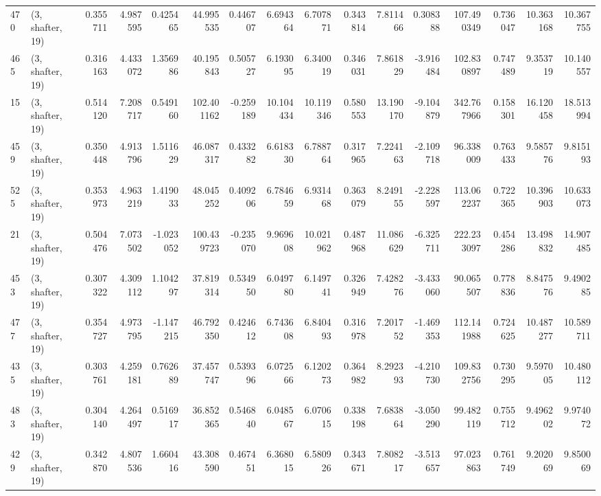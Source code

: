 \begin{tabular}{llrrrrrrrrrrrrrr}
470 &  (3, shafter, 19) &   0.355711 &   4.987595 &   0.425465 &    44.995535 &   0.446707 &   6.694364 &   6.707871 &  0.343814 &   7.811466 &   0.308388 &    107.490349 &   0.736047 &  10.363168 &   10.367755 \\
465 &  (3, shafter, 19) &   0.316163 &   4.433072 &   1.356986 &    40.195843 &   0.505727 &   6.193095 &   6.340019 &  0.346031 &   7.861829 &  -3.916484 &    102.830897 &   0.747489 &   9.353719 &   10.140557 \\
15  &  (3, shafter, 19) &   0.514120 &   7.208717 &   0.549160 &   102.401162 &  -0.259189 &  10.104434 &  10.119346 &  0.580553 &  13.190170 &  -9.104879 &    342.767966 &   0.158301 &  16.120458 &   18.513994 \\
459 &  (3, shafter, 19) &   0.350448 &   4.913796 &   1.511629 &    46.087317 &   0.433282 &   6.618330 &   6.788764 &  0.317965 &   7.224163 &  -2.109718 &     96.338009 &   0.763433 &   9.585776 &    9.815193 \\
525 &  (3, shafter, 19) &   0.353973 &   4.963219 &   1.419033 &    48.045252 &   0.409206 &   6.784659 &   6.931468 &  0.363079 &   8.249155 &  -2.228597 &    113.062237 &   0.722365 &  10.396903 &   10.633073 \\
21  &  (3, shafter, 19) &   0.504476 &   7.073502 &  -1.023052 &   100.439723 &  -0.235070 &   9.969608 &  10.021962 &  0.487968 &  11.086629 &  -6.325711 &    222.233097 &   0.454286 &  13.498832 &   14.907485 \\
453 &  (3, shafter, 19) &   0.307322 &   4.309112 &   1.104297 &    37.819314 &   0.534950 &   6.049780 &   6.149741 &  0.326949 &   7.428276 &  -3.433060 &     90.065507 &   0.778836 &   8.847576 &    9.490285 \\
477 &  (3, shafter, 19) &   0.354727 &   4.973795 &  -1.147215 &    46.792350 &   0.424612 &   6.743608 &   6.840493 &  0.316978 &   7.201752 &  -1.469353 &    112.141988 &   0.724625 &  10.487277 &   10.589711 \\
435 &  (3, shafter, 19) &   0.303761 &   4.259181 &   0.762689 &    37.457747 &   0.539396 &   6.072566 &   6.120273 &  0.364982 &   8.292393 &  -4.210730 &    109.832756 &   0.730295 &   9.597005 &   10.480112 \\
483 &  (3, shafter, 19) &   0.304140 &   4.264497 &   0.516917 &    36.852365 &   0.546840 &   6.048567 &   6.070615 &  0.338198 &   7.683864 &  -3.050290 &     99.482119 &   0.755712 &   9.496202 &    9.974072 \\
429 &  (3, shafter, 19) &   0.342870 &   4.807536 &   1.660416 &    43.308590 &   0.467451 &   6.368015 &   6.580926 &  0.343671 &   7.808217 &  -3.513657 &     97.023863 &   0.761749 &   9.202069 &    9.850069 \\

\end{tabular}
